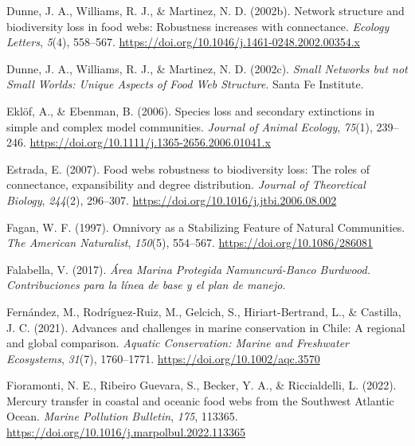 \documentclass[preprint, 3p,
authoryear]{elsarticle} %
\newlength{\cslhangindent}
\newlength{\cslentryspacingunit} %
\newenvironment{CSLReferences}[2] %
 {%
  \setlength{\parindent}{0pt}
  \ifodd #1
  \let\oldpar\par
  \def\par{\hangindent=\cslhangindent\oldpar}
  \fi
  \setlength{\parskip}{#2\cslentryspacingunit}
 }%
 {}
\begin{document}
\begin{CSLReferences}{1}{0}
\leavevmode{}%
Dunne, J. A., Williams, R. J., \& Martinez, N. D. (2002b). Network
structure and biodiversity loss in food webs: Robustness increases with
connectance. \emph{Ecology Letters}, \emph{5}(4), 558--567.
\url{https://doi.org/10.1046/j.1461-0248.2002.00354.x}

\leavevmode{}%
Dunne, J. A., Williams, R. J., \& Martinez, N. D. (2002c). \emph{Small
{Networks} but not {Small Worlds}: {Unique Aspects} of {Food Web
Structure}}. {Santa Fe Institute}.

\leavevmode{}%
Eklöf, A., \& Ebenman, B. (2006). Species loss and secondary extinctions
in simple and complex model communities. \emph{Journal of Animal
Ecology}, \emph{75}(1), 239--246.
\url{https://doi.org/10.1111/j.1365-2656.2006.01041.x}

\leavevmode{}%
Estrada, E. (2007). Food webs robustness to biodiversity loss: {The}
roles of connectance, expansibility and degree distribution.
\emph{Journal of Theoretical Biology}, \emph{244}(2), 296--307.
\url{https://doi.org/10.1016/j.jtbi.2006.08.002}

\leavevmode{}%
Fagan, W. F. (1997). Omnivory as a {Stabilizing Feature} of {Natural
Communities}. \emph{The American Naturalist}, \emph{150}(5), 554--567.
\url{https://doi.org/10.1086/286081}

\leavevmode{}%
Falabella, V. (2017). \emph{Área {Marina Protegida Namuncurá-Banco
Burdwood}. {Contribuciones} para la línea de base y el plan de manejo}.

\leavevmode{}%
Fernández, M., Rodríguez-Ruiz, M., Gelcich, S., Hiriart-Bertrand, L., \&
Castilla, J. C. (2021). Advances and challenges in marine conservation
in {Chile}: {A} regional and global comparison. \emph{Aquatic
Conservation: Marine and Freshwater Ecosystems}, \emph{31}(7),
1760--1771. \url{https://doi.org/10.1002/aqc.3570}

\leavevmode{}%
Fioramonti, N. E., Ribeiro Guevara, S., Becker, Y. A., \& Riccialdelli,
L. (2022). Mercury transfer in coastal and oceanic food webs from the
{Southwest Atlantic Ocean}. \emph{Marine Pollution Bulletin},
\emph{175}, 113365.
\url{https://doi.org/10.1016/j.marpolbul.2022.113365}


\end{CSLReferences}
\end{document}
